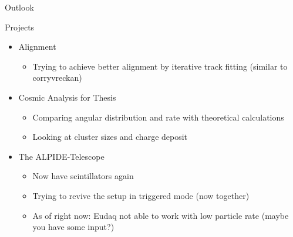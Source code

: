 \documentclass{beamer}
\begin{document}
\begin{frame}{Outlook}
    \begin{minipage}{.44\textwidth}
	\LARGE Projects \normalsize \\
	\begin{itemize}
	    \item Alignment \\[5pt]
		\begin{itemize} \tiny 
		    \item Trying to achieve better alignment by
			iterative track fitting (similar to corryvreckan)
		\end{itemize}
	    \item Cosmic Analysis for Thesis \\[5pt]
		\begin{itemize} \tiny 
		    \item Comparing angular distribution and rate with
			theoretical calculations
		    \item Looking at cluster sizes and charge deposit
		\end{itemize}
	    \item The ALPIDE-Telescope \\[5pt]
		\begin{itemize} \tiny 
		    \item Now have scintillators again
		    \item Trying to revive the setup in triggered mode
		       	(now together)
		    \item As of right now: Eudaq not able to work with low
			particle rate (maybe you have some input?)
		\end{itemize}
	

\end{itemize}
\end{minipage}
\end{frame}
\end{document}

